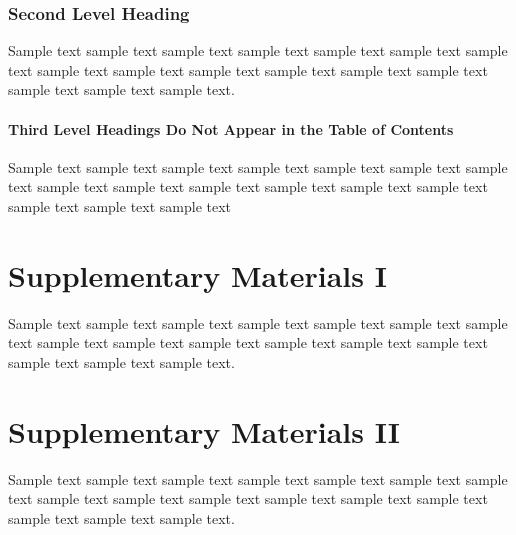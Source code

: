 \documentclass[11pt]{uonthesis}
\begin{document}
\subsection{Second Level Heading}

Sample text sample text sample text sample text sample text sample
text sample text sample text sample text sample text sample text
sample text sample text sample text sample text sample text.



\subsubsection{Third Level Headings Do Not Appear in the Table of Contents}

Sample text sample text sample text sample text sample text sample
text sample text sample text sample text sample text sample text
sample text sample text sample text sample text sample text~\cite{Lam94}

\printbibliography

\begin{appendices}

\chapter{Supplementary Materials I}

Sample text sample text sample text sample text sample text sample
text sample text sample text sample text sample text sample text
sample text sample text sample text sample text sample text.

\chapter{Supplementary Materials II}

Sample text sample text sample text sample text sample text sample
text sample text sample text sample text sample text sample text
sample text sample text sample text sample text sample text.

\end{appendices}
\end{document}
